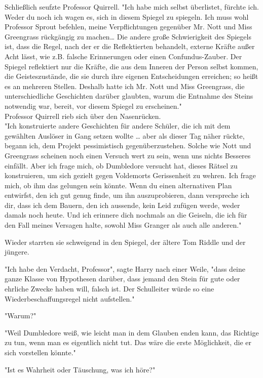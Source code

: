 {Schließlich seufzte Professor Quirrell. "Ich habe mich selbst überlistet, fürchte ich. Weder du noch ich wagen es, sich in diesem Spiegel zu spiegeln. Ich muss wohl Professor Sprout befehlen, meine Verpflichtungen gegenüber Mr. Nott und Miss Greengrass rückgängig zu machen… Die andere große Schwierigkeit des Spiegels ist, dass die Regel, nach der er die Reflektierten behandelt, externe Kräfte außer Acht lässt, wie z.B. falsche Erinnerungen oder einen Confundus-Zauber. Der Spiegel reflektiert nur die Kräfte, die aus dem Inneren der Person selbst kommen, die Geisteszustände, die sie durch ihre eigenen Entscheidungen erreichen; so heißt es an mehreren Stellen. Deshalb hatte ich Mr. Nott und Miss Greengrass, die unterschiedliche Geschichten darüber glaubten, warum die Entnahme des Steins notwendig war, bereit, vor diesem Spiegel zu erscheinen."\\ Professor Quirrell rieb sich über den Nasenrücken.\\ "Ich konstruierte andere Geschichten für andere Schüler, die ich mit dem gewählten Auslöser in Gang setzen wollte … aber als dieser Tag näher rückte, begann ich, dem Projekt pessimistisch gegenüberzustehen. Solche wie Nott und Greengrass scheinen noch einen Versuch wert zu sein, wenn uns nichts Besseres einfällt. Aber ich frage mich, ob Dumbledore versucht hat, dieses Rätsel zu konstruieren, um sich gezielt gegen Voldemorts Gerissenheit zu wehren. Ich frage mich, ob ihm das gelungen sein könnte. Wenn du einen alternativen Plan entwirfst, den ich gut genug finde, um ihn auszuprobieren, dann verspreche ich dir, dass ich dem Bauern, den ich aussende, kein Leid zufügen werde, weder damals noch heute. Und ich erinnere dich nochmals an die Geiseln, die ich für den Fall meines Versagen halte, sowohl Miss Granger als auch alle anderen."

Wieder starrten sie schweigend in den Spiegel, der ältere Tom Riddle und der jüngere.

"Ich habe den Verdacht, Professor", sagte Harry nach einer Weile, "dass deine ganze Klasse von Hypothesen darüber, dass jemand den Stein für gute oder ehrliche Zwecke haben will, falsch ist. Der Schulleiter würde so eine Wiederbeschaffungsregel nicht aufstellen."

"Warum?"

"Weil Dumbledore weiß, wie leicht man in dem Glauben enden kann, das Richtige zu tun, wenn man es eigentlich nicht tut. Das wäre die erste Möglichkeit, die er sich vorstellen könnte."

"Ist es Wahrheit oder Täuschung, was ich höre?"

}

